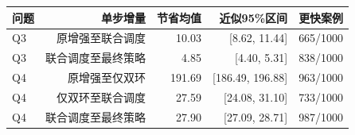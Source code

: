 \begin{tabular}{lrrrr}
\toprule
问题 & 单步增量 & 节省均值 & 近似95\%区间 & 更快案例 \\
\midrule
Q3 & 原增强至联合调度 & 10.03 & [8.62, 11.44] & 665/1000 \\
Q3 & 联合调度至最终策略 & 4.85 & [4.40, 5.31] & 838/1000 \\
Q4 & 原增强至仅双环 & 191.69 & [186.49, 196.88] & 963/1000 \\
Q4 & 仅双环至联合调度 & 27.59 & [24.08, 31.10] & 733/1000 \\
Q4 & 联合调度至最终策略 & 27.90 & [27.09, 28.71] & 987/1000 \\
\bottomrule
\end{tabular}
